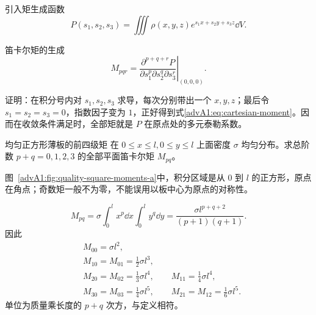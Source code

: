 引入矩生成函数
\begin{equation}\label{advA1:eq:moment-generator}
 P(s_1,s_2,s_3)=\iiint\rho(x,y,z)
 e^{s_1x+s_2y+s_3z}\dd V .
\end{equation}

\begin{advtheorem}{笛卡尔矩的生成}\label{advA1:thm:moment-generator}
\[
 M_{pqr}=\left.
 \frac{\partial^{p+q+r}P}
 {\partial s_1^p\partial s_2^q\partial s_3^r}
 \right|_{(0,0,0)}.
\]
\end{advtheorem}
证明：在积分号内对 $s_1,s_2,s_3$ 求导，每次分别带出一个 $x,y,z$；最后令 $s_1=s_2=s_3=0$，指数因子变为 $1$，正好得到式\eqref{advA1:eq:cartesian-moment}。因而在收敛条件满足时，全部矩就是 $P$ 在原点处的多元泰勒系数。

\begin{advexamplebox}{均匀正方形薄板的前四级矩}\label{advA1:ex:square-moments}
在 $0\le x\le l, 0\le y\le l$ 上面密度 $\sigma$ 均匀分布。求总阶数 $p+q=0,1,2,3$ 的全部平面笛卡尔矩 $M_{pq}$。

\begin{qualityfigure}
\label{advA1:fig:quality-square-moments-q}
\end{qualityfigure}
\end{advexamplebox}
\begin{advsolution}
\begin{qualityfigure}
\label{advA1:fig:quality-square-moments-a}
\end{qualityfigure}
图~\ref{advA1:fig:quality-square-moments-a}中，积分区域是从 $0$ 到 $l$ 的正方形，原点在角点；奇数矩一般不为零，不能误用以板中心为原点的对称性。

\[
 M_{pq}=\sigma\int_0^l x^p\dd x\int_0^l y^q\dd y
 =\frac{\sigma l^{p+q+2}}{(p+1)(q+1)}.
\]
因此
\begin{align*}
 &M_{00}=\sigma l^2,\\
 &M_{10}=M_{01}=\frac12\sigma l^3,\\
 &M_{20}=M_{02}=\frac13\sigma l^4,
 \qquad M_{11}=\frac14\sigma l^4,\\
 &M_{30}=M_{03}=\frac14\sigma l^5,
 \qquad M_{21}=M_{12}=\frac16\sigma l^5.
\end{align*}
单位为质量乘长度的 $p+q$ 次方，与定义相符。
\end{advsolution}

